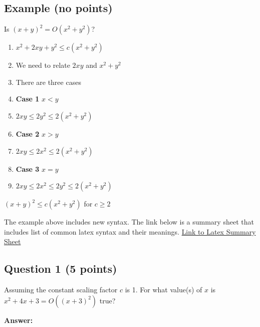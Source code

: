 \documentclass[12pt]{extarticle}
\begin{document}
\subsection{Example (no points)}

Is $(x + y)^2 = O(x^2+y^2)$?


\begin{enumerate}
    \item $x^2 +2xy+ y^2 \leq c(x^2 + y^2)$
    \item We need to relate $2xy$ and $x^2 + y^2$
    \item There are three cases
    \item {\bf Case 1}  $x < y$ 
    \item $2xy \leq 2y^2 \leq 2(x^2 + y^2)$
    \item {\bf Case 2} $x > y$
    \item $2xy \leq 2x^2 \leq 2(x^2 + y^2)$
    \item {\bf Case 3} $x = y$
    \item $2xy \leq 2x^2 \leq 2y^2 \leq 2(x^2 + y^2)$
\end{enumerate}

 $(x + y)^2 \leq c(x^2+y^2) $ for $ c \geq 2$ 
 \vspace{10mm}
 
 The example above includes new syntax.  The link below is a summary sheet that includes list of common latex syntax and their meanings. \href{https://wch.github.io/latexsheet/latexsheet-1.png}{Link to Latex Summary Sheet} 
 
\subsection{Question 1 (5 points)}
Assuming the constant scaling factor $c$ is 1. For what value(s) of $x$ is $x^2 + 4x + 3 = O((x+3)^2)$ true?

{\bf Answer:}
\end{document}
